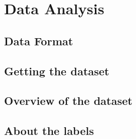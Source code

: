 \section{Data Analysis}

\subsection{Data Format}

\subsection{Getting the dataset}

\subsection{Overview of the dataset}

\subsection{About the labels}


\newpage
